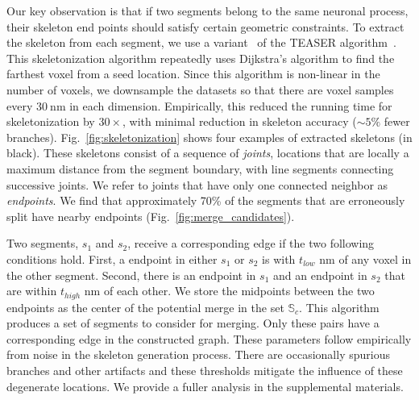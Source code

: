 Our key observation is that if two segments belong to the same neuronal process, their skeleton end points should satisfy certain geometric constraints.
To extract the skeleton from each segment, we use a variant~\cite{zhao2014automatic} of the TEASER algorithm~\cite{sato2000teasar}. 
This skeletonization algorithm repeatedly uses Dijkstra's algorithm to find the farthest voxel from a seed location. 
Since this algorithm is non-linear in the number of voxels, we downsample the datasets so that there are voxel samples every $\SI{30}{\nano\meter}$ in each dimension.
Empirically, this reduced the running time for skeletonization by $30\times$, with minimal reduction in skeleton accuracy (${\sim}5\%$ fewer branches). 
Fig.~\ref{fig:skeletonization} shows four examples of extracted skeletons (in black). 
These skeletons consist of a sequence of \textit{joints}, locations that are locally a maximum distance from the segment boundary, with line segments connecting successive joints. 
We refer to joints that have only one connected neighbor as \textit{endpoints}. 
We find that approximately 70\% of the segments that are erroneously split have nearby endpoints (Fig.~\ref{fig:merge_candidates}). 

Two segments, $s_1$ and $s_2$, receive a corresponding edge if the two following conditions hold.
First, a endpoint in either $s_1$ or $s_2$ is with $t_{low}$ nm of any voxel in the other segment.
Second, there is an endpoint in $s_1$ and an endpoint in $s_2$ that are within $t_{high}$ nm of each other.
We store the midpoints between the two endpoints as the center of the potential merge in the set $\mathbb{S}_c$. 
This algorithm produces a set of segments to consider for merging. 
Only these pairs have a corresponding edge in the constructed graph.
These parameters follow empirically from noise in the skeleton generation process. 
There are occasionally spurious branches and other artifacts and these thresholds mitigate the influence of these degenerate locations.
We provide a fuller analysis in the supplemental materials.

